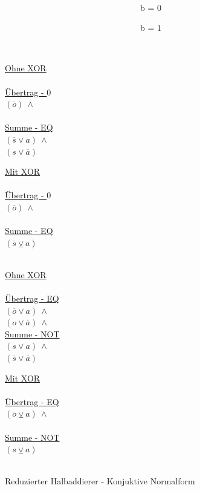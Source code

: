 \begin{figure}[!h]
  \centering
  \begin{minipage}[c]{0.3cm}
    ~
  \end{minipage}
  \begin{minipage}[c]{7.1cm}
    ~~~~~~~~~~~~~~~~~~~~~~~~~~~~~~~~b = $0$
  \end{minipage}
  \begin{minipage}[c]{7cm}
    ~~~~~~~~~~~~~~~~~~~~~~~~~~~~~~~~b = $1$
  \end{minipage}
  \begin{minipage}[l]{0.4cm}
    ~
  \end{minipage}
  \begin{minipage}[l]{3.5cm}
    \underline{Ohne XOR}\\
    ~\\
    \underline{Übertrag - $0$}\\
    $ (\overline{o}) ~ \wedge $\\
    ~\\
    \underline{Summe - EQ}\\
    $ (\overline{s} \vee  a) ~ \wedge $\\
    $ (s \vee \overline{a}) $
  \end{minipage}
  \begin{minipage}[l]{3.5cm}
    \underline{Mit XOR}\\
    ~\\
    \underline{Übertrag - $0$}\\
    $ (\overline{o}) ~ \wedge $\\
    ~\\
    \underline{Summe - EQ}\\
    $ (\overline{s} \veebar a) $\\
    ~
  \end{minipage}
  \begin{minipage}[l]{3.5cm}
    \underline{Ohne XOR}\\
    ~\\
    \underline{Übertrag - EQ}\\
    $ (\overline{o} \vee  a) ~ \wedge $\\
    $ (o \vee \overline{a}) ~ \wedge $\\
    \underline{Summe - NOT}\\
    $ (s \vee  a) ~ \wedge $\\
    $ (\overline{s} \vee \overline{a}) $
  \end{minipage}
  \begin{minipage}[l]{3.5cm}
    \underline{Mit XOR}\\
    ~\\
    \underline{Übertrag - EQ}\\
    $ (\overline{o} \veebar a) ~ \wedge $\\
    ~\\
    \underline{Summe - NOT}\\
    $ (s \veebar a) $\\
    ~
  \end{minipage}
  \caption{Reduzierter Halbaddierer - Konjuktive Normalform}
  \label{fig:red_halfadder_cnf}
\end{figure}

